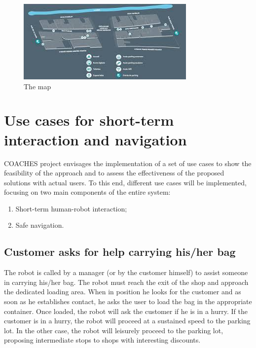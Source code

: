 \begin{figure}[!t]
\begin{center}
\includegraphics[width=0.7\linewidth]{MapsRorne}
\caption{The map}
\label{default}
\end{center}
\end{figure}


\section{Use cases for short-term interaction and navigation}

COACHES project envisages the implementation of a set of use cases
to show the feasibility of the approach and to assess the effectiveness
of the proposed solutions with actual users.
To this end, different use cases will be implemented, focusing on two main
components of the entire system:
\begin{enumerate}
\item Short-term human-robot interaction;
\item Safe navigation.
\end{enumerate}


\subsection{Customer asks for help carrying his/her bag}

The robot is called by a manager (or by the customer himself) to assist
someone in carrying his/her bag. The robot must reach
the exit of the shop and approach the dedicated loading area. When
in position he looks for the customer and as soon as he establishes
contact, he asks the user to load the bag in the appropriate container.
Once loaded, the robot will ask the customer if he is in a hurry.
If the customer is in a hurry, the robot will proceed at a sustained
speed to the parking lot. In the other case, the robot will leisurely
proceed to the parking lot, proposing intermediate stops to shops
with interesting discounts.




